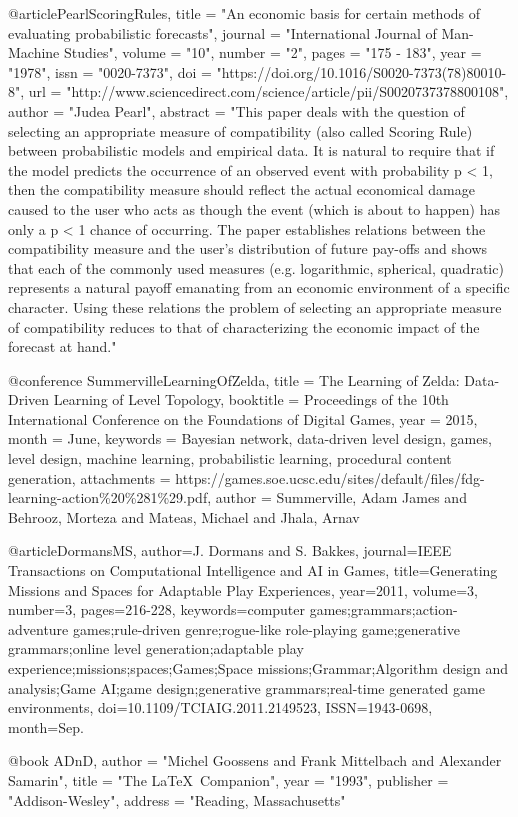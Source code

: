 @article{PearlScoringRules,
title = "An economic basis for certain methods of evaluating probabilistic forecasts",
journal = "International Journal of Man-Machine Studies",
volume = "10",
number = "2",
pages = "175 - 183",
year = "1978",
issn = "0020-7373",
doi = "https://doi.org/10.1016/S0020-7373(78)80010-8",
url = "http://www.sciencedirect.com/science/article/pii/S0020737378800108",
author = "Judea Pearl",
abstract = "This paper deals with the question of selecting an appropriate measure of compatibility (also called Scoring Rule) between probabilistic models and empirical data. It is natural to require that if the model predicts the occurrence of an observed event with probability p < 1, then the compatibility measure should reflect the actual economical damage caused to the user who acts as though the event (which is about to happen) has only a p < 1 chance of occurring. The paper establishes relations between the compatibility measure and the user's distribution of future pay-offs and shows that each of the commonly used measures (e.g. logarithmic, spherical, quadratic) represents a natural payoff emanating from an economic environment of a specific character. Using these relations the problem of selecting an appropriate measure of compatibility reduces to that of characterizing the economic impact of the forecast at hand."
}

@conference {SummervilleLearningOfZelda,
	title = {The Learning of Zelda: Data-Driven Learning of Level Topology},
	booktitle = {Proceedings of the 10th International Conference on the Foundations of Digital Games},
	year = {2015},
	month = {June},
	keywords = {Bayesian network, data-driven level design, games, level design, machine learning, probabilistic learning, procedural content generation},
	attachments = {https://games.soe.ucsc.edu/sites/default/files/fdg-learning-action\%20\%281\%29.pdf},
	author = {Summerville, Adam James and Behrooz, Morteza and Mateas, Michael and Jhala, Arnav}
}

@article{DormansMS,
author={J. {Dormans} and S. {Bakkes}},
journal={IEEE Transactions on Computational Intelligence and AI in Games},
title={Generating Missions and Spaces for Adaptable Play Experiences},
year={2011},
volume={3},
number={3},
pages={216-228},
keywords={computer games;grammars;action-adventure games;rule-driven genre;rogue-like role-playing game;generative grammars;online level generation;adaptable play experience;missions;spaces;Games;Space missions;Grammar;Algorithm design and analysis;Game AI;game design;generative grammars;real-time generated game environments},
doi={10.1109/TCIAIG.2011.2149523},
ISSN={1943-0698},
month={Sep.}
}

@book {ADnD,
author = "Michel Goossens and Frank Mittelbach and Alexander Samarin",
title = "The \LaTeX\ Companion",
year = "1993",
publisher = "Addison-Wesley",
address = "Reading, Massachusetts"}